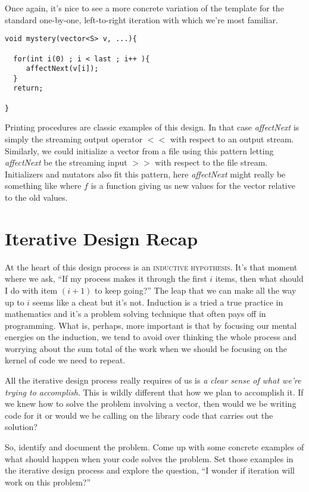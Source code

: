 \documentclass[]{tufte-handout}
\begin{document}
Once again, it's nice to see a more concrete variation of the template for the standard one-by-one, left-to-right iteration with which we're most familiar.
\begin{verbatim}
void mystery(vector<S> v, ...){
  
  for(int i(0) ; i < last ; i++ ){
     affectNext(v[i]);  
  } 
  return;
 
} 
\end{verbatim}

Printing procedures are classic examples of this design. In that case \textit{affectNext} is simply the streaming output operator $<<$ with respect to an output stream. Similarly, we could initialize a vector from a file using this pattern letting \textit{affectNext} be the streaming input $>>$ with respect to the file stream. Initializers and mutators also fit this pattern, here \textit{affectNext} might really be something like  where $f$ is a function giving us new values for the vector relative to the old values.

\section{Iterative Design Recap}

At the heart of this design process is an \textsc{inductive hypothesis}. It's that moment where we ask, ``If my process makes it through the first $i$ items, then what should I do with item $(i+1)$ to keep going?'' The leap that we can make all the way up to $i$ seems like a cheat but it's not.  Induction is a tried a true practice in mathematics and it's a problem solving technique that often pays off in programming.  What is, perhaps, more important is that by focusing our mental energies on the induction, we tend to avoid over thinking the whole process and worrying about the sum total of the work when we should be focusing on the kernel of code we need to repeat. 

All the iterative design process really requires of us is \textit{a clear sense of \textit{what} we're trying to accomplish}. This is wildly different that how we plan to accomplish it.  If we knew how to solve the problem involving a vector, then would we be writing code for it or would we be calling on the library code that carries out the solution? 

So, identify and document the problem. Come up with some concrete examples of what should happen when your code solves the problem. Set those examples in the iterative design process and explore the question, ``I wonder if iteration will work on this problem?'' 
\end{document}
